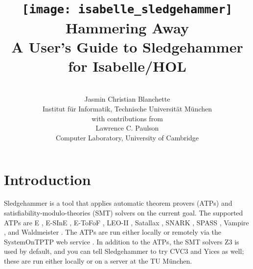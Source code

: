 \documentclass[a4paper,12pt]{article}
\begin{document}
\renewcommand\labelitemi{\raise.065ex\hbox{\small\textbullet}}


\title{\texttt{[image: isabelle\_sledgehammer]} \\[4ex]
Hammering Away \\[\smallskipamount]
\Large A User's Guide to Sledgehammer for Isabelle/HOL}
\author{\hbox{} \\
Jasmin Christian Blanchette \\
{\normalsize Institut f\"ur Informatik, Technische Universit\"at M\"unchen} \\[4\smallskipamount]
{\normalsize with contributions from} \\[4\smallskipamount]
Lawrence C. Paulson \\
{\normalsize Computer Laboratory, University of Cambridge} \\
\hbox{}}

\maketitle

\tableofcontents

\setlength{\parskip}{.7em plus .2em minus .1em}
\setlength{\parindent}{0pt}
\setlength{\abovedisplayskip}{\parskip}
\setlength{\abovedisplayshortskip}{.9\parskip}
\setlength{\belowdisplayskip}{\parskip}
\setlength{\belowdisplayshortskip}{.9\parskip}

\newenvironment{enum}%
    {\begin{list}{}{%
        \setlength{\topsep}{.1\parskip}%
        \setlength{\partopsep}{.1\parskip}%
        \setlength{\itemsep}{\parskip}%
        \advance\itemsep by-\parsep}}
    {\end{list}}

\def\pre{\begingroup\vskip0pt plus1ex\advance\leftskip by\leftmargin
\advance\rightskip by\leftmargin}
\def\post{\vskip0pt plus1ex\endgroup}

\def\prew{\pre\advance\rightskip by-\leftmargin}
\def\postw{\post}

\section{Introduction}
\label{introduction}

Sledgehammer is a tool that applies automatic theorem provers (ATPs)
and satisfiability-modulo-theories (SMT) solvers on the current goal. The
supported ATPs are E \cite{schulz-2002}, E-SInE \cite{sine}, E-ToFoF
\cite{tofof}, LEO-II \cite{leo2}, Satallax \cite{satallax}, SNARK \cite{snark},
SPASS \cite{weidenbach-et-al-2009}, Vampire \cite{riazanov-voronkov-2002}, and
Waldmeister \cite{waldmeister}. The ATPs are run either locally or remotely via
the System\-On\-TPTP web service \cite{sutcliffe-2000}. In addition to the ATPs,
the SMT solvers Z3 \cite{z3} is used by default, and you can tell Sledgehammer
to try CVC3 \cite{cvc3} and Yices \cite{yices} as well; these are run either
locally or on a server at the TU M\"unchen.
\end{document}
